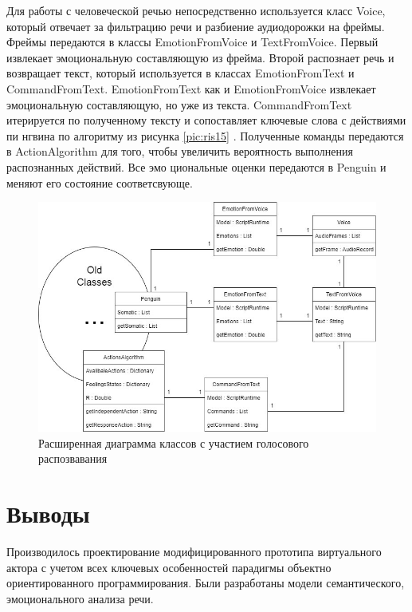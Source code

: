 Для работы с человеческой речью непосредственно используется класс Voice, который отвечает за фильтрацию речи и разбиение аудиодорожки на фреймы. 
Фреймы передаются в классы EmotionFromVoice   
и TextFromVoice. Первый извлекает эмоциональную составляющую из фрейма. Второй распознает речь   
и возвращает текст, который используется в классах EmotionFromText и CommandFromText.   
EmotionFromText как и EmotionFromVoice извлекает эмоциональную составляющую, но уже из текста. 
CommandFromText итерируется по полученному тексту и сопоставляет ключевые слова с действиями пи  
нгвина по алгоритму из рисунка \ref{pic:ris15} . Полученные команды передаются в   
ActionAlgorithm для того, чтобы увеличить вероятность выполнения распознанных действий. Все эмо  
циональные оценки передаются в Penguin и меняют его состояние соответсвующе.

\begin{figure}[!h]
\includegraphics[width=0.75\columnwidth]{./img/ncmodel0.jpg}
\centering
\caption{Расширенная диаграмма классов с участием голосового распозвавания}
\label{pic:ncmodel0}
\end{figure}

\section{Выводы}

Производилось проектирование модифицированного прототипа виртуального актора 
с учетом всех ключевых особенностей парадигмы объектно ориентированного программирования. 
Были разработаны модели семантического, эмоционального анализа речи.
